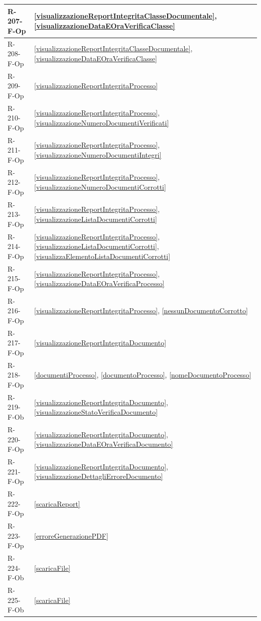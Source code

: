 \begin{longtable}{|p{4cm}|p{10cm}|}
\hline
R-207-F-Op & \ref{visualizzazioneReportIntegritaClasseDocumentale}, \ref{visualizzazioneDataEOraVerificaClasse} \\
\hline
R-208-F-Op & \ref{visualizzazioneReportIntegritaClasseDocumentale}, \ref{visualizzazioneDataEOraVerificaClasse} \\
\hline
R-209-F-Op & \ref{visualizzazioneReportIntegritaProcesso} \\
\hline
R-210-F-Op & \ref{visualizzazioneReportIntegritaProcesso}, \ref{visualizzazioneNumeroDocumentiVerificati} \\
\hline
R-211-F-Op & \ref{visualizzazioneReportIntegritaProcesso}, \ref{visualizzazioneNumeroDocumentiIntegri} \\
\hline
R-212-F-Op & \ref{visualizzazioneReportIntegritaProcesso}, \ref{visualizzazioneNumeroDocumentiCorrotti} \\
\hline
R-213-F-Op & \ref{visualizzazioneReportIntegritaProcesso}, \ref{visualizzazioneListaDocumentiCorrotti} \\
\hline
R-214-F-Op & \ref{visualizzazioneReportIntegritaProcesso}, \ref{visualizzazioneListaDocumentiCorrotti}, \ref{visualizzaElementoListaDocumentiCorrotti} \\
\hline
R-215-F-Op & \ref{visualizzazioneReportIntegritaProcesso}, \ref{visualizzazioneDataEOraVerificaProcesso} \\
\hline
R-216-F-Op & \ref{visualizzazioneReportIntegritaProcesso}, \ref{nessunDocumentoCorrotto} \\
\hline
R-217-F-Op & \ref{visualizzazioneReportIntegritaDocumento} \\
\hline
R-218-F-Op & \ref{documentiProcesso}, \ref{documentoProcesso}, \ref{nomeDocumentoProcesso} \\
\hline
R-219-F-Ob & \ref{visualizzazioneReportIntegritaDocumento}, \ref{visualizzazioneStatoVerificaDocumento} \\
\hline
R-220-F-Op & \ref{visualizzazioneReportIntegritaDocumento}, \ref{visualizzazioneDataEOraVerificaDocumento} \\
\hline
R-221-F-Op & \ref{visualizzazioneReportIntegritaDocumento}, \ref{visualizzazioneDettagliErroreDocumento} \\
\hline
R-222-F-Op & \ref{scaricaReport} \\
\hline
R-223-F-Op & \ref{erroreGenerazionePDF} \\
\hline
R-224-F-Ob & \ref{scaricaFile} \\
\hline
R-225-F-Ob & \ref{scaricaFile} \\
\hline

\end{longtable}

